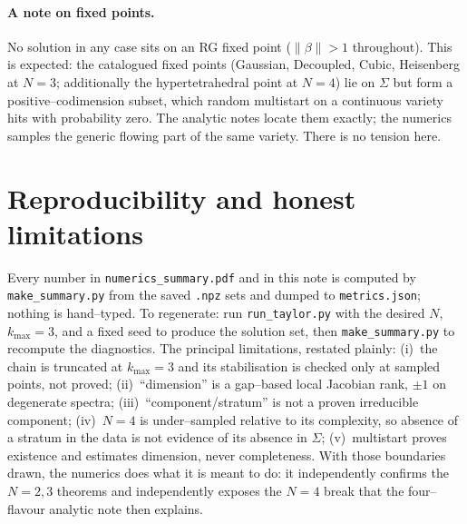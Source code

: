 \documentclass[11pt]{article}
\newcommand{\norm}[1]{\lVert #1\rVert}
\newcommand{\code}[1]{\texttt{#1}}
\begin{document}
\paragraph{A note on fixed points.}
No solution in any case sits on an RG fixed point ($\norm\beta>1$ throughout).
This is expected: the catalogued fixed points (Gaussian, Decoupled, Cubic,
Heisenberg at $N=3$; additionally the hypertetrahedral point at $N=4$) lie on
$\Sigma$ but form a positive--codimension subset, which random multistart on a
continuous variety hits with probability zero. The analytic notes locate them
exactly; the numerics samples the generic flowing part of the same variety.
There is no tension here.

\section{Reproducibility and honest limitations}
\label{sec:repro}

Every number in \code{numerics\_summary.pdf} and in this note is computed by
\code{make\_summary.py} from the saved \code{.npz} sets and dumped to
\code{metrics.json}; nothing is hand--typed. To regenerate: run
\code{run\_taylor.py} with the desired $N$, $k_{\max}=3$, and a fixed seed to
produce the solution set, then \code{make\_summary.py} to recompute the
diagnostics. The principal limitations, restated plainly:
(i)~the chain is truncated at $k_{\max}=3$ and its stabilisation is checked only
at sampled points, not proved;
(ii)~``dimension'' is a gap--based local Jacobian rank, $\pm1$ on degenerate
spectra;
(iii)~``component/stratum'' is not a proven irreducible component;
(iv)~$N=4$ is under--sampled relative to its complexity, so absence of a
stratum in the data is not evidence of its absence in $\Sigma$;
(v)~multistart proves existence and estimates dimension, never completeness.
With those boundaries drawn, the numerics does what it is meant to do: it
independently confirms the $N=2,3$ theorems and independently exposes the
$N=4$ break that the four--flavour analytic note then explains.
\end{document}
